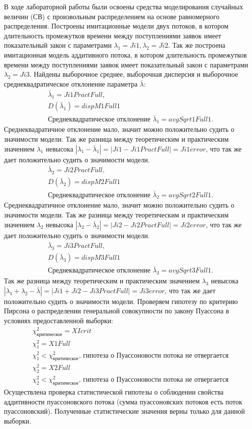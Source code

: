 В ходе лабораторной работы были освоены средства моделирования случайных величин (СВ) с произвольным распределением на основе равномерного распределения.\n
Построены имитационные модели двух потоков, в котором длительность промежутков времени между поступлениями заявок имеет показательный закон с параметрами $\lambda_1 = Ji1,\lambda_2 = Ji2$. Так же построена имитационная модель аддитивного потока, в котором длительность промежутков времени между поступлениями заявок имеет показательный закон с параметрами $\lambda_2 = Ji3$.\n 
Найдены выборочное среднее, выборочная дисперсия и выборочное среднеквадратическое отклонение параметра $\bar\lambda$:
\begin{align*}
&\bar\lambda_1=Ji1PractFull,\\
&D(\bar\lambda_1)=dispM1Full1\\
&\text{Среднеквадратическое отклонение }\bar\lambda_1=avgSqrt1Full1.
\end{align*}\n
Среднеквадратичное отклонение мало, значит можно положительно судить о значимости модели.\n
Так же разница между теоретическим и практическим значением $\lambda_1$ невысока $|\lambda_1 - \bar\lambda_1| = |Ji1 - Ji1PractFull| = Ji1error$, что так же дает положительно судить о значимости модели.
\begin{align*}
&\bar\lambda_2=Ji2PractFull,\\
&D(\bar\lambda_2)=dispM2Full1\\
&\text{Среднеквадратическое отклонение }\bar\lambda_2=avgSqrt2Full1.
\end{align*}\n
Среднеквадратичное отклонение мало, значит можно положительно судить о значимости модели.\n
Так же разница между теоретическим и практическим значением $\lambda_2$ невысока $|\lambda_2 - \bar\lambda_2| = |Ji2 - Ji2PractFull| = Ji2error$, что так же дает положительно судить о значимости модели.
\begin{align*}
&\bar\lambda_3=Ji3PractFull,\\
&D(\bar\lambda_3)=dispM3Full1\\
&\text{Среднеквадратическое отклонение }\bar\lambda_3=avgSqrt3Full1.
\end{align*}\n
Так же разница между теоретическим и практическим значением $\lambda_3$ невысока $|\lambda_1 + \lambda_2 - \bar\lambda| = |Ji1+Ji2-Ji3PractFull| = Ji3error$, что так же дает положительно судить о значимости модели.\n
Проверяем гипотезу по критерию Пирсона о распределении генеральной совокупности по закону Пуассона в условиях предоставленной выборки:
\begin{align*}
&\chi_\text{критическое}^2=XIcrit\\
&\chi_1^2=X1Full\\
&\chi_1^2<\chi_\text{критическое}^2\text{, гипотеза о Пуассоновости потока не отвергается}\\
&\chi_2^2=X2Full\\
&\chi_2^2<\chi_\text{критическое}^2\text{, гипотеза о Пуассоновости потока не отвергается}
\end{align*}\n
Осуществлена проверка статистической гипотезы о соблюдении свойства аддитивности пуассоновского потока (сумма пуассоновских потоков есть поток пуассоновский). Полученные статистические значения верны только для данной выборки.